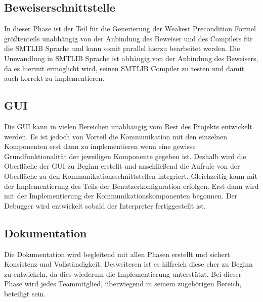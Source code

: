 \subsection{Beweiserschnittstelle}
In dieser Phase ist der Teil für die Generierung der Weakest Precondition Formel größtenteils unabhängig von der Anbindung des Beweiser und des Compilers für die SMTLIB Sprache und kann somit parallel hierzu bearbeitet werden. Die Umwandlung in SMTLIB Sprache ist abhängig von der Anbindung des Beweisers, da es hiermit ermöglicht wird, seinen SMTLIB Compiler zu testen und damit auch korrekt zu implementieren.

\subsection{GUI}
Die GUI kann in vielen Bereichen unabhängig vom Rest des Projekts entwickelt werden. Es ist jedoch von Vorteil die Kommunikation mit den einzelnen Komponenten erst dann zu implementieren wenn eine gewisse Grundfunktionalität der jeweiligen Komponente gegeben ist. Deshalb wird die Oberfläche der GUI zu Beginn erstellt und anschließend die Aufrufe von der Oberfläche zu den Kommunikationsschnittstellen integriert. Gleichzeitig kann mit der Implementierung des Teils der Benutzerkonfiguration erfolgen. Erst dann wird mit der Implementierung der Kommunikationskomponenten begonnen. Der Debugger wird entwickelt sobald der Interpreter fertiggestellt ist.

\subsection{Dokumentation}
Die Dokumentation wird begleitend mit allen Phasen erstellt und sichert Konsistenz und Vollständigkeit. Desweiteren ist es hilfreich diese eher zu Beginn zu entwickeln, da dies wiederum die Implementierung unterstützt. Bei dieser Phase wird jedes Teammitglied, überwiegend in seinem zugehörigen Bereich, beteiligt sein.
